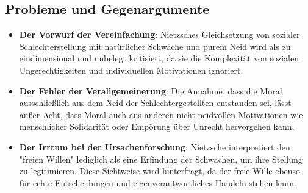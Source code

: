 \documentclass{article}
\begin{document}
\subsection*{Probleme und Gegenargumente}

\begin{itemize}
	\item \textbf{Der Vorwurf der Vereinfachung}: Nietzsches Gleichsetzung von sozialer Schlechterstellung mit natürlicher Schwäche und purem Neid wird als zu eindimensional und unbelegt kritisiert, da sie die Komplexität von sozialen Ungerechtigkeiten und individuellen Motivationen ignoriert.

	\item \textbf{Der Fehler der Verallgemeinerung}: Die Annahme, dass die Moral ausschließlich aus dem Neid der Schlechtergestellten entstanden sei, lässt außer Acht, dass Moral auch aus anderen nicht-neidvollen Motivationen wie menschlicher Solidarität oder Empörung über Unrecht hervorgehen kann.

	\item \textbf{Der Irrtum bei der Ursachenforschung}: Nietzsche interpretiert den "freien Willen" lediglich als eine Erfindung der Schwachen, um ihre Stellung zu legitimieren. Diese Sichtweise wird hinterfragt, da der freie Wille ebenso für echte Entscheidungen und eigenverantwortliches Handeln stehen kann.
\end{itemize}
\end{document}
